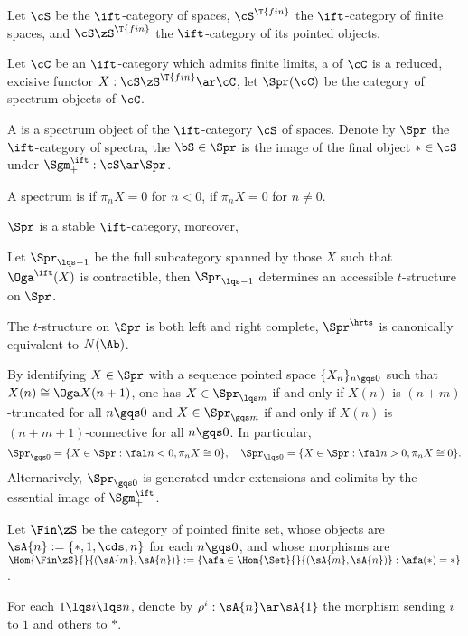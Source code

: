 \documentclass[article, a4paper, twoside]{universal}
\begin{document}
\begin{dfn}[1.4.2.5, 1.4.2.8, 1.4.3.1, 1.4.4.5]
    Let $\cS$ be the $\ift$-category of spaces, $\cS^{\T{fin}}$ the $\ift$-category of finite spaces, and $\cS\zS^{\T{fin}}$ the $\ift$-category of its pointed objects.

    Let $\cC$ be an $\ift$-category which admits finite limits, a  of $\cC$ is a reduced, excisive functor $X:\cS\zS^{\T{fin}}\ar\cC$, let $\Spr(\cC)$ be the category of spectrum objects of $\cC$.

    A  is a spectrum object of the $\ift$-category $\cS$ of spaces. Denote by $\Spr$ the $\ift$-category of spectra, the  $\bS\in\Spr$ is the image of the final object $*\in\cS$ under $\Sgm_{+}^{\ift}:\cS\ar\Spr$.

    A spectrum is  if $\pi_{n}X=0$ for $n<0$,  if $\pi_{n}X=0$ for $n\neq0$.
\end{dfn}


\begin{thm}[1.4.3.5, 1.4.3.6]
    $\Spr$ is a stable $\ift$-category, moreover,
    \begin{enr}[label=(\arabic*)]
        \item Let $\Spr_{\lqs-1}$ be the full subcategory spanned by those $X$ such that $\Oga^{\ift}(X)$ is contractible, then $\Spr_{\lqs-1}$ determines an accessible $t$-structure on $\Spr$.
        \item The $t$-structure on $\Spr$ is both left and right complete, $\Spr^{\hrts}$ is canonically equivalent to $N(\Ab)$.
    \end{enr}

    By identifying $X\in\Spr$ with a sequence pointed space $\{X_{n}\}_{n\gqs0}$ such that $X(n)\cong\Oga X(n+1)$, one has $X\in\Spr_{\lqs m}$ if and only if $X(n)$ is $(n+m)$-truncated for all $n\gqs0$ and $X\in\Spr_{\gqs m}$ if and only if $X(n)$ is $(n+m+1)$-connective for all $n\gqs0$. In particular,
    \[
        \Spr_{\gqs0}=\{X\in\Spr:\fal n < 0, \pi_{n}X\cong 0\},\quad \Spr_{\lqs0}=\{X\in\Spr:\fal n>0, \pi_{n}X\cong 0\}.
    \]
    Alternarively, $\Spr_{\gqs0}$ is generated under extensions and colimits by the essential image of $\Sgm_{+}^{\ift}$.
\end{thm}


\begin{dfn}[2.0.0.2]
    Let $\Fin\zS$ be the category of pointed finite set, whose objects are $\sA{n}:=\{*,1,\cds,n\}$ for each $n\gqs0$, and whose morphisms are $\Hom{\Fin\zS}{}{(\sA{m},\sA{n})}:=\{\afa\in\Hom{\Set}{}{(\sA{m},\sA{n})}:\afa(*)=*\}$.

    For each $1\lqs i\lqs n$, denote by $\rho^{i}:\sA{n}\ar\sA{1}$ the morphism sending $i$ to $1$ and others to $*$.
\end{dfn}
\end{document}
